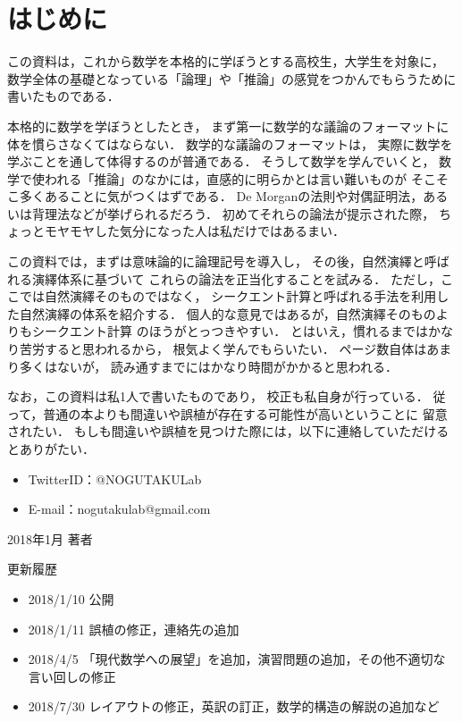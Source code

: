 \chapter{はじめに}
 この資料は，これから数学を本格的に学ぼうとする高校生，大学生を対象に，
 数学全体の基礎となっている「論理」や「推論」の感覚をつかんでもらうために書いたものである．
 
 本格的に数学を学ぼうとしたとき，
 まず第一に数学的な議論のフォーマットに体を慣らさなくてはならない．
 数学的な議論のフォーマットは，
 実際に数学を学ぶことを通して体得するのが普通である．
 そうして数学を学んでいくと，
 数学で使われる「推論」のなかには，直感的に明らかとは言い難いものが
 そこそこ多くあることに気がつくはずである．
 De Morganの法則や対偶証明法，あるいは背理法などが挙げられるだろう．
 初めてそれらの論法が提示された際，
 ちょっとモヤモヤした気分になった人は私だけではあるまい．
 
 この資料では，まずは意味論的に論理記号を導入し，
 その後，自然演繹と呼ばれる演繹体系に基づいて
 これらの論法を正当化することを試みる．
 ただし，ここでは自然演繹そのものではなく，
 シークエント計算と呼ばれる手法を利用した自然演繹の体系を紹介する．
 個人的な意見ではあるが，自然演繹そのものよりもシークエント計算
 のほうがとっつきやすい．
 とはいえ，慣れるまではかなり苦労すると思われるから，
 根気よく学んでもらいたい．
 ページ数自体はあまり多くはないが，
 読み通すまでにはかなり時間がかかると思われる．

 なお，この資料は私1人で書いたものであり，
 校正も私自身が行っている．
 従って，普通の本よりも間違いや誤植が存在する可能性が高いということに
 留意されたい．
 もしも間違いや誤植を見つけた際には，以下に連絡していただけるとありがたい．

 \begin{itemize}
   \item TwitterID：@NOGUTAKULab
   \item E-mail：nogutakulab@gmail.com
 \end{itemize}

  
\begin{flushright}
  2018年1月 著者
\end{flushright}

 更新履歴
 \begin{itemize}
   \item 2018/1/10 公開
   \item 2018/1/11 誤植の修正，連絡先の追加
   \item 2018/4/5 「現代数学への展望」を追加，演習問題の追加，その他不適切な言い回しの修正
   \item 2018/7/30 レイアウトの修正，英訳の訂正，数学的構造の解説の追加など
 \end{itemize}
  
